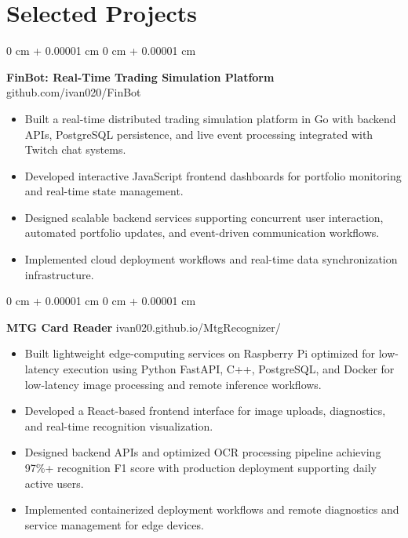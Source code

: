 \documentclass[6pt, letterpaper]{article}
\newenvironment{highlights}{
    \begin{itemize}[
        topsep=0.03 cm,
        parsep=0.03 cm,
        partopsep=0pt,
        itemsep=0pt,
        leftmargin=0 cm + 10pt
    ]
}{
    \end{itemize}
} %
\newenvironment{onecolentry}{
    \begin{adjustwidth}{
        0 cm + 0.00001 cm
    }{
        0 cm + 0.00001 cm
    }
}{
    \end{adjustwidth}
} %
\begin{document}
    \section{Selected Projects}

    \begin{onecolentry}
        \textbf{FinBot:  Real-Time Trading Simulation Platform} \hfill github.com/ivan020/FinBot

        \begin{highlights}
            \item Built a real-time distributed trading simulation platform in Go with backend APIs, PostgreSQL persistence, and live event processing integrated with Twitch chat systems.
            \item Developed interactive JavaScript frontend dashboards for portfolio monitoring and real-time state management.
            \item Designed scalable backend services supporting concurrent user interaction, automated portfolio updates, and event-driven communication workflows.
            \item Implemented cloud deployment workflows and real-time data synchronization infrastructure.
        \end{highlights}
    \end{onecolentry}

    \begin{onecolentry}
        \textbf{MTG Card Reader} \hfill ivan020.github.io/MtgRecognizer/

        \begin{highlights}
            \item Built lightweight edge-computing services on Raspberry Pi optimized for low-latency execution using Python FastAPI, C++, PostgreSQL, and Docker for low-latency image processing and remote inference workflows.
            \item Developed a React-based frontend interface for image uploads, diagnostics, and real-time recognition visualization.
            \item Designed backend APIs and optimized OCR processing pipeline achieving 97\%+ recognition F1 score with production deployment supporting daily active users.
            \item Implemented containerized deployment workflows and remote diagnostics and service management for edge devices.
        \end{highlights}
    \end{onecolentry}
\end{document}
